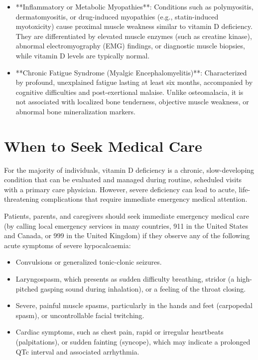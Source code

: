 \begin{itemize}
    \item **Inflammatory or Metabolic Myopathies**: Conditions such as polymyositis, dermatomyositis, or drug-induced myopathies (e.g., statin-induced myotoxicity) cause proximal muscle weakness similar to vitamin D deficiency. They are differentiated by elevated muscle enzymes (such as creatine kinase), abnormal electromyography (EMG) findings, or diagnostic muscle biopsies, while vitamin D levels are typically normal.
    \item **Chronic Fatigue Syndrome (Myalgic Encephalomyelitis)**: Characterized by profound, unexplained fatigue lasting at least six months, accompanied by cognitive difficulties and post-exertional malaise. Unlike osteomalacia, it is not associated with localized bone tenderness, objective muscle weakness, or abnormal bone mineralization markers.
\end{itemize}

\section*{When to Seek Medical Care}
For the majority of individuals, vitamin D deficiency is a chronic, slow-developing condition that can be evaluated and managed during routine, scheduled visits with a primary care physician. However, severe deficiency can lead to acute, life-threatening complications that require immediate emergency medical attention.

Patients, parents, and caregivers should seek immediate emergency medical care (by calling local emergency services in many countries, 911 in the United States and Canada, or 999 in the United Kingdom) if they observe any of the following acute symptoms of severe hypocalcaemia:
\begin{itemize}
    \item Convulsions or generalized tonic-clonic seizures.
    \item Laryngospasm, which presents as sudden difficulty breathing, stridor (a high-pitched gasping sound during inhalation), or a feeling of the throat closing.
    \item Severe, painful muscle spasms, particularly in the hands and feet (carpopedal spasm), or uncontrollable facial twitching.
    \item Cardiac symptoms, such as chest pain, rapid or irregular heartbeats (palpitations), or sudden fainting (syncope), which may indicate a prolonged QTc interval and associated arrhythmia.
\end{itemize}

